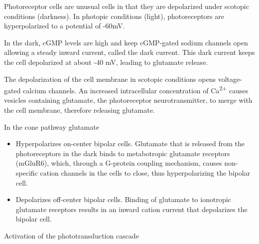\documentclass[]{book}
\providecommand{\tightlist}{%
  \setlength{\itemsep}{0pt}\setlength{\parskip}{0pt}}
\begin{document}
Photoreceptor cells are unusual cells in that they are depolarized under scotopic conditions (darkness). In photopic conditions (light), photoreceptors are hyperpolarized to a potential of -60mV.

In the dark, cGMP levels are high and keep cGMP-gated sodium channels open allowing a steady inward current, called the dark current. This dark current keeps the cell depolarized at about -40 mV, leading to glutamate release.

The depolarization of the cell membrane in scotopic conditions opens voltage-gated calcium channels. An increased intracellular concentration of Ca\textsuperscript{2+} causes vesicles containing glutamate, the photoreceptor neurotransmitter, to merge with the cell membrane, therefore releasing glutamate.

In the cone pathway glutamate

\begin{itemize}
\tightlist
\item
  Hyperpolarizes on-center bipolar cells. Glutamate that is released from the photoreceptors in the dark binds to metabotropic glutamate receptors (mGluR6), which, through a G-protein coupling mechanism, causes non-specific cation channels in the cells to close, thus hyperpolarizing the bipolar cell.
\item
  Depolarizes off-center bipolar cells. Binding of glutamate to ionotropic glutamate receptors results in an inward cation current that depolarizes the bipolar cell.
\end{itemize}

Activation of the phototransduction cascade
\end{document}
